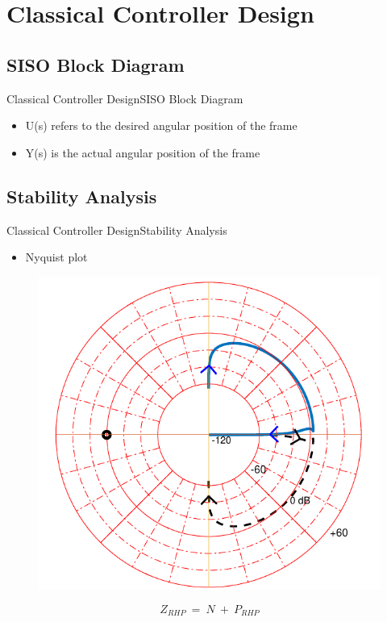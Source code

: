 
\section{Classical Controller Design}

\subsection{SISO Block Diagram}
\begin{frame}{Classical Controller Design}{SISO Block Diagram}	
	\begin{figure}
		
	\end{figure}
	\begin{itemize}
		\item U(s) refers to the desired angular position of the frame
		\item Y(s) is the actual angular position of the frame
	\end{itemize}
\end{frame}

\subsection{Stability Analysis}
\begin{frame}{Classical Controller Design}{Stability Analysis}	 
\begin{itemize}
	\item Nyquist plot
\end{itemize}
\begin{figure}
	\includegraphics[scale=.5]{Pictures/nyquistCubli}
	\centering
\end{figure}	
\begin{displaymath}
	\si{Z_{RHP}\ =\ N\ +\ P_{RHP}} \nonumber
\end{displaymath}
\end{frame}

